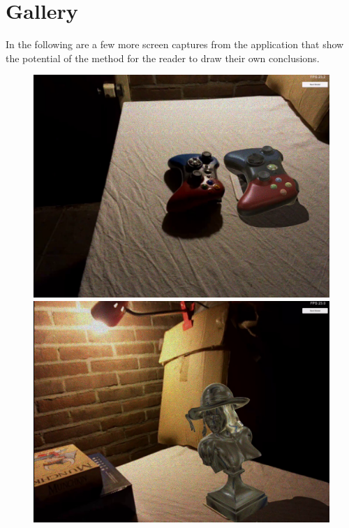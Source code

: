 \section{Gallery}
In the following are a few more screen captures from the application that show the potential of the method for the reader to draw their own conclusions.
\begin{figure}[H]
    \centering
    \begin{minipage}{0.38\textwidth}
        \centering
        \includegraphics[width=1.5\textwidth]{Figures/ContBoth.png} %
    \end{minipage}\hfill
    \begin{minipage}{0.38\textwidth}
        \centering
        \includegraphics[width=1.5\textwidth]{Figures/Lena1.png} %

\end{minipage}
\end{figure}
